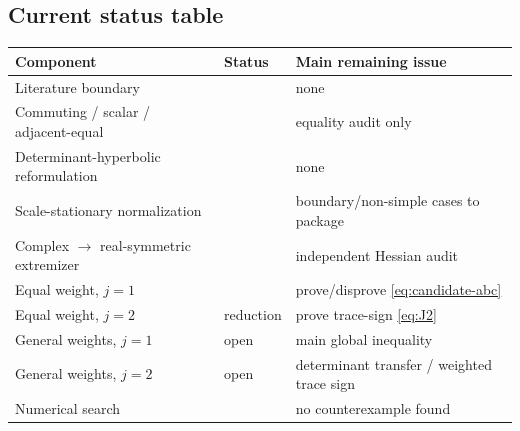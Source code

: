 \subsection{Current status table}
\begin{center}
\begin{tabularx}{\textwidth}{@{}l l X@{}}
\toprule
Component & Status & Main remaining issue\\
\midrule
Literature boundary & \statusL{} & none\\
Commuting / scalar / adjacent-equal & \statusR{} & equality audit only\\
Determinant-hyperbolic reformulation & \statusR{} & none\\
Scale-stationary normalization & \statusR{} & boundary/non-simple cases to package\\
Complex $\to$ real-symmetric extremizer & \statusW{} & independent Hessian audit\\
Equal weight, $j=1$ & \statusW{} & prove/disprove \eqref{eq:candidate-abc}\\
Equal weight, $j=2$ & \statusR{} reduction & prove trace-sign \eqref{eq:J2}\\
General weights, $j=1$ & open & main global inequality\\
General weights, $j=2$ & open & determinant transfer / weighted trace sign\\
Numerical search & \statusN{} & no counterexample found\\
\bottomrule
\end{tabularx}
\end{center}
